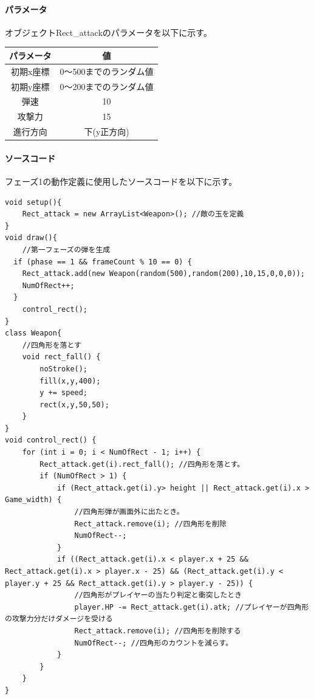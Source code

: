 \documentclass[a4paper,titlepage,11pt]{ltjsarticle}
\begin{document}
\paragraph{パラメータ}
オブジェクトRect\_attackのパラメータを以下に示す。
\begin{table}[H]
	\centering
	\begin{tabular}{|c|c|}
		\hline
		パラメータ & 値 \\ \hline \hline
		初期x座標 & 0～500までのランダム値 \\ \hline
		初期y座標 & 0～200までのランダム値 \\ \hline
		弾速 & 10 \\ \hline
		攻撃力 & 15 \\ \hline
		進行方向 & 下(y正方向) \\ \hline
	\end{tabular}
\end{table}

\paragraph{ソースコード}
フェーズ1の動作定義に使用したソースコードを以下に示す。
\begin{lstlisting}
void setup(){
	Rect_attack = new ArrayList<Weapon>(); //敵の玉を定義
}
void draw(){
	//第一フェーズの弾を生成
  if (phase == 1 && frameCount % 10 == 0) {
    Rect_attack.add(new Weapon(random(500),random(200),10,15,0,0,0));
    NumOfRect++;
  }
	control_rect();
}
class Weapon{
	//四角形を落とす
    void rect_fall() {
        noStroke();
        fill(x,y,400);
        y += speed;
        rect(x,y,50,50);
    }
}
void control_rect() {
    for (int i = 0; i < NumOfRect - 1; i++) {
        Rect_attack.get(i).rect_fall(); //四角形を落とす。
        if (NumOfRect > 1) {
            if (Rect_attack.get(i).y> height || Rect_attack.get(i).x > Game_width) {
                //四角形弾が画面外に出たとき。
                Rect_attack.remove(i); //四角形を削除
                NumOfRect--;
            }
            if ((Rect_attack.get(i).x < player.x + 25 && Rect_attack.get(i).x > player.x - 25) && (Rect_attack.get(i).y < player.y + 25 && Rect_attack.get(i).y > player.y - 25)) {
                //四角形がプレイヤーの当たり判定と衝突したとき
                player.HP -= Rect_attack.get(i).atk; //プレイヤーが四角形の攻撃力分だけダメージを受ける
                Rect_attack.remove(i); //四角形を削除する
                NumOfRect--; //四角形のカウントを減らす。
            }
        }
    }
}
\end{lstlisting}
\end{document}
